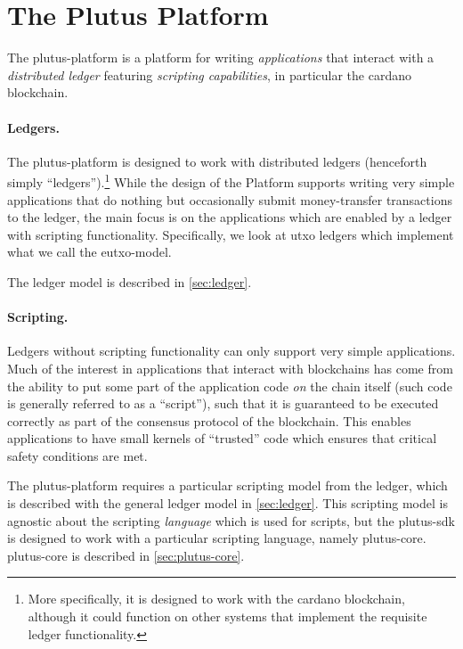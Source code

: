 \documentclass[plutus.tex]{subfiles}
\begin{document}
\section{The Plutus Platform}

The \gls{plutus-platform} is a platform for writing \emph{applications} that interact with a \emph{distributed ledger} featuring \emph{scripting capabilities}, in particular the \gls{cardano} blockchain.

\paragraph{Ledgers.}
The \gls{plutus-platform} is designed to work with distributed ledgers (henceforth simply ``ledgers'').\footnote{
More specifically, it is designed to work with the \gls{cardano} blockchain, although it could function on other systems that implement the requisite ledger functionality.
}
While the design of the Platform supports writing very simple applications that do nothing but occasionally submit money-transfer transactions to the ledger,
 the main focus is on the applications which are enabled by a ledger with scripting functionality.
Specifically, we look at \gls{utxo} ledgers which implement what we call the \gls{eutxo-model}.

The ledger model is described in \cref{sec:ledger}.

\paragraph{Scripting.}
Ledgers without scripting functionality can only support very simple applications.
Much of the interest in applications that interact with blockchains has come from the ability to put some part of the application code \emph{on} the chain itself (such code is generally referred to as a ``\gls{script}''), such that it is guaranteed to be executed correctly as part of the consensus protocol of the blockchain.
This enables applications to have small kernels of ``trusted'' code which ensures that critical safety conditions are met.

The \gls{plutus-platform} requires a particular scripting model from the ledger, which is described with the general ledger model in \cref{sec:ledger}.
This scripting model is agnostic about the scripting \emph{language} which is used for \glspl{script}, but the \gls{plutus-sdk} is designed to work with a particular scripting language, namely \gls{plutus-core}. \Gls{plutus-core} is described in \cref{sec:plutus-core}.
\end{document}
